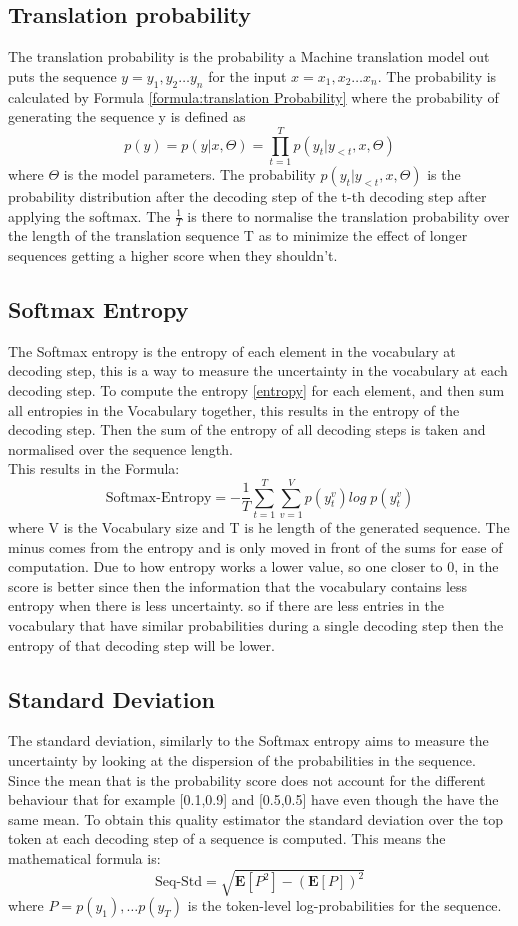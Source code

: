 \subsection{Translation probability}
The translation probability is the probability a Machine translation model out puts the sequence $y = y_1, y_2 \dots y_n$ for the input $x=x_1, x_2 \dots x_n$. The probability is calculated by Formula \ref{formula:translation Probability} where the probability of generating the sequence y is defined as $$ p(y)=p(y|x,\Theta)=\prod_{t=1}^T p(y_t|y_{<t}, x, \Theta)$$ where $\Theta$ is the model parameters.
The probability $p(y_t|y_{<t}, x,\Theta)$ is the probability distribution after the decoding step of the t-th decoding step after applying the softmax.
The $\frac{1}{T}$ is there to normalise the translation probability over the length of the translation sequence T as to minimize the effect of longer sequences getting a higher score when they shouldn't. 


\subsection{Softmax Entropy}\label{sect:entropy}
The Softmax entropy is the entropy of each element in the vocabulary at decoding step, this is a way to measure the uncertainty in the vocabulary at each decoding step.
To compute the entropy \ref{entropy} for each element, and then sum all entropies in the Vocabulary together, this results in the entropy of the decoding step. 
Then the sum of the entropy of all decoding steps is taken and normalised over the sequence length. \\
This results in the Formula:
$$\text{Softmax-Entropy}=-\frac{1}{T}\sum_{t=1}^T\sum_{v=1}^V p(y_t^v)log\; p(y_t^v) \label{formula:translation entropy}$$ where V is the Vocabulary size and T is he length of the generated sequence. The minus comes from the entropy and is only moved in front of the sums for ease of computation.
Due to how entropy works a lower value, so one closer to 0, in the score is better since then the information that the vocabulary contains less entropy when there is less uncertainty. so if there are less entries in the vocabulary that have similar probabilities during a single decoding step then the entropy of that decoding step will be lower.

\subsection{Standard Deviation}\label{sect:stddiv}
The standard deviation, similarly to the Softmax entropy aims to measure the uncertainty by looking at the dispersion of the probabilities in the sequence. 
Since the mean that is the probability score does not account for the different behaviour that for example [0.1,0.9] and [0.5,0.5] have even though the have the same mean. 
To obtain this quality estimator the standard deviation over the top token at each decoding step of a sequence is computed.
This means the mathematical formula is: $$\text{Seq-Std}=\sqrt{\mathbf{E}[P^2]-(\mathbf{E}[P])^2}$$ where $P=p(y_1) , \dots p(y_T)$ is the token-level log-probabilities for the sequence.

